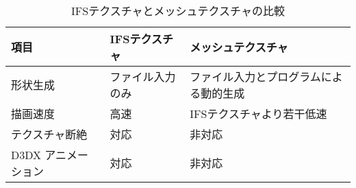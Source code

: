 \begin{table}[H]
\caption{IFSテクスチャとメッシュテクスチャの比較}
\label{tbl:meshtexture}
\begin{center}
\begin{tabular}{|l||l|l|}
\hline
項目 & IFSテクスチャ & メッシュテクスチャ \\ \hline \hline
形状生成 & ファイル入力のみ & ファイル入力とプログラムによる動的生成 \\ \hline
描画速度 & 高速 & IFSテクスチャより若干低速 \\ \hline
テクスチャ断絶 & 対応 & 非対応 \\ \hline
D3DX アニメーション & 対応 & 非対応 \\ \hline
\end{tabular}
\end{center}
\end{table}

